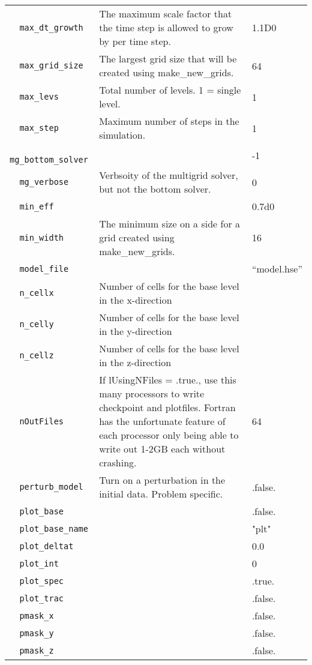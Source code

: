{\begin{center}
\begin{longtable}{|l|p{3.25in}|l|}
\verb=  max_dt_growth =  & The maximum scale factor that the time step is allowed to grow by per time step.  
                              &  1.1D0 \\
\verb=  max_grid_size =  & The largest grid size that will be created using make\_new\_grids.  &  64 \\
\verb=  max_levs =  & Total number of levels.  1 = single level.  &  1 \\
\verb=  max_step =  & Maximum number of steps in the simulation.  & 1 \\
\verb=  mg_bottom_solver =  &   &  -1 \\
\verb=  mg_verbose =  & Verbsoity of the multigrid solver, but not the bottom solver.  &  0 \\
\verb=  min_eff =  &   &  0.7d0 \\
\verb=  min_width =  & The minimum size on a side  for a grid created using make\_new\_grids.  &  16 \\
\verb=  model_file =  &   & ``model.hse'' \\
\verb=  n_cellx =  & Number of cells for the base level in the x-direction  &  \\
\verb=  n_celly =  & Number of cells for the base level in the y-direction  &  \\
\verb=  n_cellz =  & Number of cells for the base level in the z-direction  &  \\
\verb=  nOutFiles =  & If lUsingNFiles = .true., use this many processors to write checkpoint and plotfiles.  
                           Fortran has the unfortunate feature of each processor only being able to write out 
                           1-2GB each without crashing.  & 64 \\
\verb=  perturb_model =  & Turn on a perturbation in the initial data.  Problem specific.  &  .false. \\
\verb=  plot_base =  &   & .false. \\
\verb=  plot_base_name =  &   &  "plt" \\
\verb=  plot_deltat =  &   &  0.0 \\
\verb=  plot_int =  &   & 0 \\
\verb=  plot_spec =  &   & .true. \\
\verb=  plot_trac =  &   & .false. \\
\verb=  pmask_x =  &   &  .false. \\
\verb=  pmask_y =  &   &  .false. \\
\verb=  pmask_z =  &   &  .false. \\

\end{longtable}
\end{center}}
